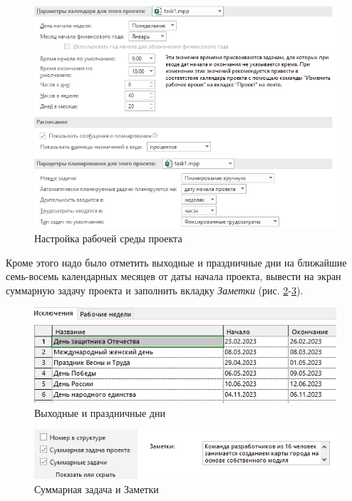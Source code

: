 \newpage
\begin{figure}[!h]
	\centering
	\includegraphics[width=1\linewidth]{inc/img/4.png}
	\caption{Настройка рабочей среды проекта}
	\label{p4}
\end{figure}

Кроме этого надо было отметить выходные и праздничные дни на ближайшие семь-восемь календарных месяцев от даты начала проекта, вывести на экран суммарную задачу проекта и заполнить вкладку \textit{Заметки} (рис. \ref{p5}-\ref{p5.0}).
\begin{figure}[!h]
	\centering
	\includegraphics[width=1\linewidth]{inc/img/5.png}
	\caption{Выходные и праздничные дни}
	\label{p5}
\end{figure}

\begin{figure}[!h]
	\centering
	\includegraphics[width=1\linewidth]{inc/img/5.0.png}
	\caption{Суммарная задача и Заметки}
	\label{p5.0}
\end{figure}

